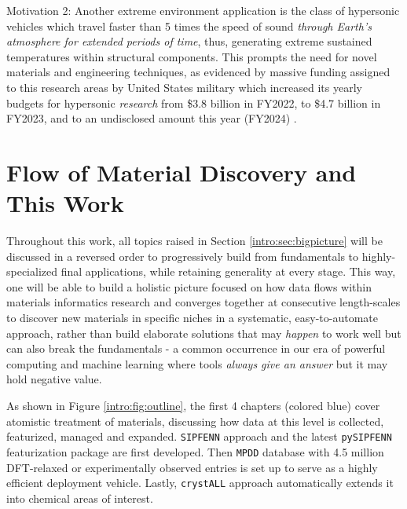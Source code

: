 Motivation 2:
Another extreme environment application is the class of hypersonic vehicles which travel faster than 5 times the speed of sound \emph{through Earth's atmosphere for extended periods of time}, thus, generating extreme sustained temperatures within structural components. This prompts the need for novel materials and engineering techniques, as evidenced by massive funding assigned to this research areas by United States military which increased its yearly budgets for hypersonic \emph{research} from \$3.8 billion in FY2022, to \$4.7 billion in FY2023, and to an undisclosed amount this year (FY2024) \cite{Sayler2024HypersonicCongress}.

\todo



\section{Flow of Material Discovery and This Work} \label{intro:sec:flow}

Throughout this work, all topics raised in Section \ref{intro:sec:bigpicture} will be discussed in a reversed order to progressively build from fundamentals to highly-specialized final applications, while retaining generality at every stage. This way, one will be able to build a holistic picture focused on how data flows within materials informatics research and converges together at consecutive length-scales to discover new materials in specific niches in a systematic, easy-to-automate approach, rather than build elaborate solutions that may \emph{happen} to work well but can also break the fundamentals - a common occurrence in our era of powerful computing and machine learning where tools \emph{always give an answer} but it may hold negative value.

As shown in Figure \ref{intro:fig:outline}, the first 4 chapters (colored blue) cover atomistic treatment of materials, discussing how data at this level is collected, featurized, managed and expanded. \texttt{SIPFENN} approach and the latest \texttt{pySIPFENN} featurization package are first developed. Then \texttt{MPDD} database with 4.5 million DFT-relaxed or experimentally observed entries is set up to serve as a highly efficient deployment vehicle. Lastly, \texttt{crystALL} approach automatically extends it into chemical areas of interest.

